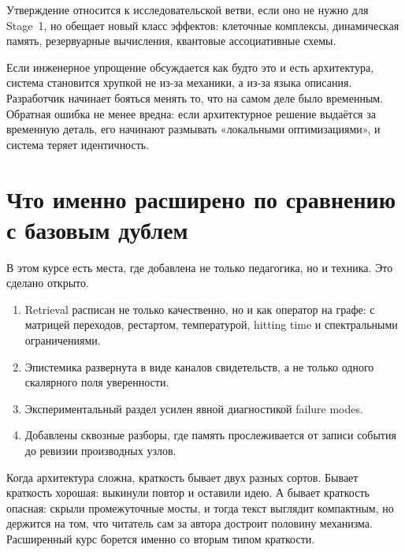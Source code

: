 \begin{definition}
Утверждение относится к исследовательской ветви, если оно не нужно для Stage~1,
но обещает новый класс эффектов: клеточные комплексы, динамическая память, резервуарные
вычисления, квантовые ассоциативные схемы.
\end{definition}

\begin{pitfall}
Если инженерное упрощение обсуждается как будто это и есть архитектура, система
становится хрупкой не из-за механики, а из-за языка описания. Разработчик начинает
бояться менять то, что на самом деле было временным. Обратная ошибка не менее вредна:
если архитектурное решение выдаётся за временную деталь, его начинают размывать
«локальными оптимизациями», и система теряет идентичность.
\end{pitfall}

\section{Что именно расширено по сравнению с базовым дублем}

В этом курсе есть места, где добавлена не только педагогика, но и техника.
Это сделано открыто.

\begin{enumerate}
\item Retrieval расписан не только качественно, но и как оператор на графе: с
матрицей переходов, рестартом, температурой, hitting time и спектральными
ограничениями.
\item Эпистемика развернута в виде каналов свидетельств, а не только одного
скалярного поля уверенности.
\item Экспериментальный раздел усилен явной диагностикой failure modes.
\item Добавлены сквозные разборы, где память прослеживается от записи события до
ревизии производных узлов.
\end{enumerate}

\begin{intuition}
Когда архитектура сложна, краткость бывает двух разных сортов. Бывает краткость
хорошая: выкинули повтор и оставили идею. А бывает краткость опасная: скрыли
промежуточные мосты, и тогда текст выглядит компактным, но держится на том, что
читатель сам за автора достроит половину механизма. Расширенный курс борется именно
со вторым типом краткости.
\end{intuition}

